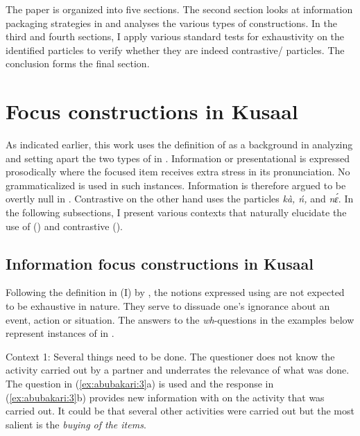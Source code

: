 \documentclass[output=paper,modfonts,nonflat,
\ChapterDOI{10.5281/zenodo.3367154}
 hidelinks
]{langsci/langscibook}
\begin{document}
The paper is organized into five sections. The second section looks at information packaging strategies in  and analyses the various types of  constructions. In the third and fourth sections, I apply various standard tests for exhaustivity on the identified  particles to verify whether they are indeed contrastive{\slash} particles. The conclusion forms the final section.

\section{Focus constructions in {Kusaal}}

As indicated earlier, this work uses the definition of \citet{ÉKiss1998} as a background in analyzing and setting apart the two types of  in . Information or presentational  is expressed prosodically where the focused item receives extra stress in its pronunciation. No grammaticalized  is used in such instances. Information  is therefore argued to be overtly null in . Contrastive  on the other hand uses the particles \textit{kà, ń,} and \textit{nɛ́}. In the following subsections, I present various contexts that naturally elucidate the use of  () and contrastive  ().

\subsection{Information focus constructions in {Kusaal}}\label{sec:abubakari:2.1}

Following the definition in (I) by \citet[246]{ÉKiss1998}, the notions expressed using  are not expected to be exhaustive in nature. They serve to dissuade one’s ignorance about an event, action or situation. The answers to the \textit{wh}{}-questions in the examples below represent instances of  in . 

Context 1: Several things need to be done. The questioner does not know the activity carried out by a partner and underrates the relevance of what was done. The question in (\ref{ex:abubakari:3}a) is used and the response in (\ref{ex:abubakari:3}b) provides new information with  on the activity that was carried out. It could be that several other activities were carried out but the most salient is the \textit{buying of the items}.
 
\end{document}
